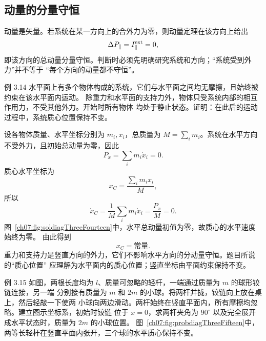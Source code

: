 \subsection{动量的分量守恒}

动量是矢量。若系统在某一方向上的合外力为零，则动量定理在该方向上给出
\[
 \Delta P_{\parallel}=I_{\parallel}^{\rm ext}=0,
\]
即该方向的总动量分量守恒。判断时必须先明确研究系统和方向；“系统受到外力”并不等于
“每个方向的动量都不守恒”。

\begin{origexamplebox}{例 3.14}
水平面上有多个物体构成的系统，它们与水平面之间均无摩擦，且始终被约束在该水平面内运动。
除重力和水平面的支持力外，物体只受系统内部的相互作用力，不受其他外力。开始时所有物体
均处于静止状态。证明：在此后的运动过程中，系统质心位置保持不变。
\end{origexamplebox}

\begin{xesolution}
设各物体质量、水平坐标分别为 $m_i,x_i$，总质量为 $M=\sum_i m_i$。系统在水平方向
不受外力，且初始总动量为零，因此
\[
 P_x=\sum_i m_i\dot x_i=0.
\]
质心水平坐标为
\[
 x_C=\frac{\sum_i m_ix_i}{M},
\]
所以
\[
 \dot x_C=\frac{1}{M}\sum_i m_i\dot x_i
 =\frac{P_x}{M}=0.
\]
图~\ref{ch07:fig:soldiagThreeFourteen}中，水平总动量初值为零，故质心的水平速度始终为零。
\soldiagThreeFourteen
由此得到
\[
 \boxed{x_C=\text{常量}}.
\]
重力和支持力是竖直方向的外力，它们不影响水平方向的分动量守恒。题目所说的“质心位置”
应理解为水平面内的质心位置；竖直坐标由平面约束保持不变。
\end{xesolution}

\Needspace{0.34\textheight}
\begin{origexamplebox}{例 3.15}
如图，两根长度均为 $l$、质量可忽略的轻杆，一端通过质量为 $m$ 的球形铰链连接，另一端
分别接有质量为 $m$ 和 $2m$ 的小球。将两杆并拢，铰链向上放在桌上，然后轻敲一下使两
小球向两边滑动。两杆始终在竖直平面内，所有摩擦均忽略。建立图示坐标系，初始时铰链
位于 $x=0$，求两杆夹角为 $90^\circ$ 以及完全展开成水平状态时，质量为 $2m$ 的小球位置。
图~\ref{ch07:fig:probdiagThreeFifteen}中，两等长轻杆在竖直平面内张开，三个球的水平质心保持不变。
\probdiagThreeFifteen
\end{origexamplebox}

